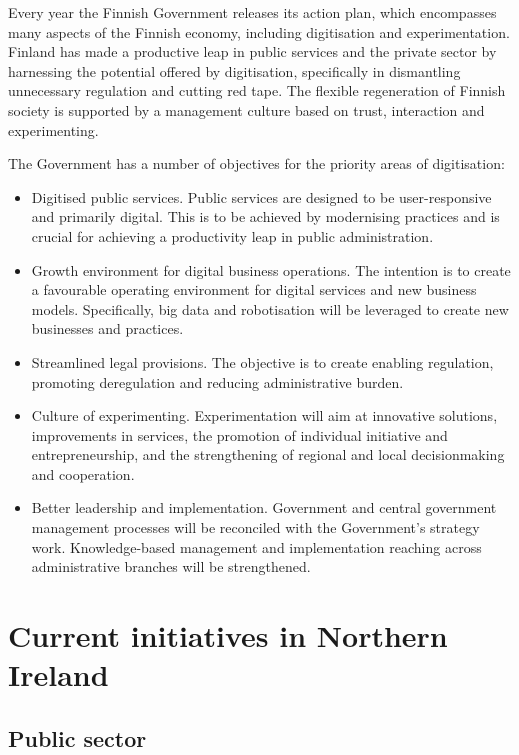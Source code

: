 Every year the Finnish Government releases its action plan, which encompasses many aspects of the Finnish economy, including digitisation and experimentation. Finland has made a productive leap in public services and the private sector by harnessing the potential offered by digitisation, specifically in dismantling unnecessary regulation and cutting red tape. The flexible regeneration of Finnish society is supported by a management culture based on trust, interaction and experimenting.

The Government has a number of objectives for the priority areas of digitisation:
\begin{itemize}
    \item Digitised public services. Public services are designed to be user-responsive and primarily digital. This is to be achieved by modernising practices and is crucial for achieving a productivity leap in public administration.
    \item Growth environment for digital business operations. The intention is to create a favourable operating environment for digital services and new business models. Specifically, big data and robotisation will be leveraged to create new businesses and practices.
    \item Streamlined legal provisions. The objective is to create enabling regulation, promoting deregulation and reducing administrative burden.
    \item Culture of experimenting. Experimentation will aim at innovative solutions, improvements in services, the promotion of individual initiative and entrepreneurship, and the strengthening of regional and local decisionmaking and cooperation.
    \item Better leadership and implementation. Government and central government management processes will be reconciled with the Government's strategy work. Knowledge-based management and implementation reaching across administrative branches will be strengthened.
\end{itemize}

\section{Current initiatives in Northern Ireland}

\subsection{Public sector}

